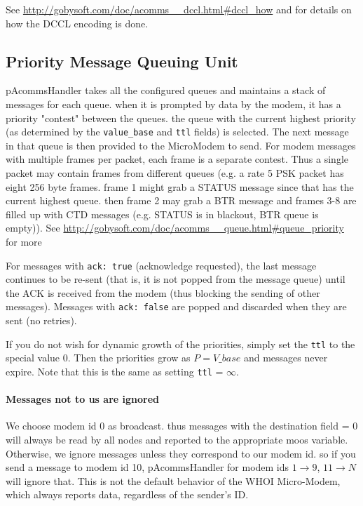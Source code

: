\documentclass[11pt, letterpaper, oneside]{memoir}
\begin{document}
See \url{http://gobysoft.com/doc/acomms__dccl.html#dccl_how} and \cite{dccl_oceans10} for details on how the DCCL encoding is done.

\subsection{Priority Message Queuing Unit}

pAcommsHandler takes all the configured queues and maintains a stack of messages for each queue. when it is prompted by data by the modem, it has a priority "contest" between the queues. the queue with the current highest priority (as determined by the \verb|value_base| and \verb|ttl| fields) is selected. The next message in that queue is then provided to the MicroModem to send. For modem messages with multiple frames per packet, each frame is a separate contest. Thus a single packet may contain frames from different
 queues (e.g. a rate 5 PSK packet has eight 256 byte frames. frame 1 might grab a STATUS message since that has the current highest queue. then frame 2 may grab a BTR message and frames 3-8 are filled up with CTD messages (e.g. STATUS is in blackout, BTR queue is empty)). See \url{http://gobysoft.com/doc/acomms__queue.html#queue_priority} for more

For messages with \verb|ack: true| (acknowledge requested), the last message continues to be re-sent (that is, it is not popped from the message queue) until the ACK is received from the modem (thus blocking the sending of other messages). Messages with \verb|ack: false| are popped and discarded when they are sent (no retries).

If you do not wish for dynamic growth of the priorities, simply set the \verb|ttl| to the special value 0. Then the priorities grow as $P = V\_{base}$ and messages never expire. Note that this is the same as setting \verb|ttl| = $\infty$.

\paragraph{Messages not to us are ignored} We choose modem id 0 as broadcast. thus messages with the destination field = 0 will always be read by all nodes and reported to the
  appropriate moos variable. Otherwise, we ignore messages unless they correspond to our modem id. so if you send a message to modem id 10, pAcommsHandler for modem ids $1 \rightarrow 9$, $11\rightarrow N$  will ignore that. This is not the default behavior of the WHOI Micro-Modem, which always reports data, regardless of the sender's ID.
  
\end{document}
